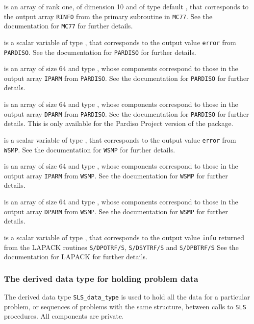 \documentclass{galahad}
\newcommand{\packagename}{SLS}
\begin{document}
\begin{description}
 is an array of rank one, of dimension 10 and of
type default \realdp, that corresponds to the output array {\tt RINFO}
from the primary subroutine in {\tt MC77}. See the documentation for
{\tt MC77} for further details.

 is a scalar variable of type \integer,
that corresponds to the output value {\tt error}
from {\tt PARDISO}. See the documentation for {\tt PARDISO} for further
details.

 is an array of size 64 and type \integer,
whose components correspond to those in the output array {\tt IPARM}
from {\tt PARDISO}. See the documentation for {\tt PARDISO} for further
details.

 is an array of size 64 and type \realdp,
whose components correspond to those in the output array {\tt DPARM}
from {\tt PARDISO}. See the documentation for {\tt PARDISO} for further
details. This is only available for the Pardiso Project version of the package.

 is a scalar variable of type \integer,
that corresponds to the output value {\tt error}
from {\tt WSMP}. See the documentation for {\tt WSMP} for further
details.

 is an array of size 64 and type \integer,
whose components correspond to those in the output array {\tt IPARM}
from {\tt WSMP}. See the documentation for {\tt WSMP} for further
details.

 is an array of size 64 and type \realdp,
whose components correspond to those in the output array {\tt DPARM}
from {\tt WSMP}. See the documentation for {\tt WSMP} for further
details.

 is a scalar variable of type \integer,
that corresponds to the output value {\tt info} returned from
the LAPACK routines {\tt S/DPOTRF/S},
{\tt S/DSYTRF/S} and {\tt S/DPBTRF/S}
See the documentation for LAPACK for further
details.

\end{description}



\subsubsection{The derived data type for holding problem data}\label{typedata}
The derived data type
{\tt \packagename\_data\_type}
is used to hold all the data for a particular problem,
or sequences of problems with the same structure, between calls to
{\tt \packagename} procedures.
All components are private.
\end{document}
